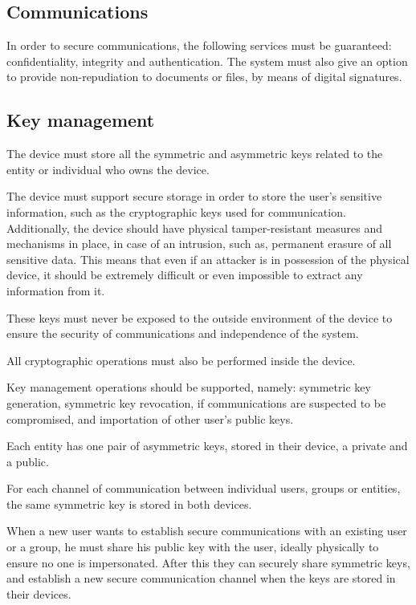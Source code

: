\subsection{Communications}\label{chap:problem:services:comms}
In order to secure communications, the following services must be guaranteed: confidentiality, integrity and authentication.
The system must also give an option to provide non-repudiation to documents or files, by means of digital signatures.


\subsection{Key management}\label{chap:problem:services:key}
The device must store all the symmetric and asymmetric keys related to the entity or individual who owns the device.

The device must support secure storage in order to store the user's sensitive information, such as the cryptographic keys used for communication.
Additionally, the device should have physical tamper-resistant measures and mechanisms in place, in case of an intrusion, such as, permanent erasure of all sensitive data. 
This means that even if an attacker is in possession of the physical device, it should be extremely difficult or even impossible to extract any information from it.

These keys must never be exposed to the outside environment of the device to ensure the security of communications and independence of the system.

All cryptographic operations must also be performed inside the device.

Key management operations should be supported, namely: symmetric key generation, symmetric key revocation, if communications are suspected to be compromised, and importation of other user's public keys.

Each entity has one pair of asymmetric keys, stored in their device, a private and a public.

For each channel of communication between individual users, groups or entities, the same symmetric key is stored in both devices.

When a new user wants to establish secure communications with an existing user or a group, he must share his public key with the user, ideally physically to ensure no one is impersonated. After this they can securely share symmetric keys, and establish a new secure communication channel when the keys are stored in their devices.

